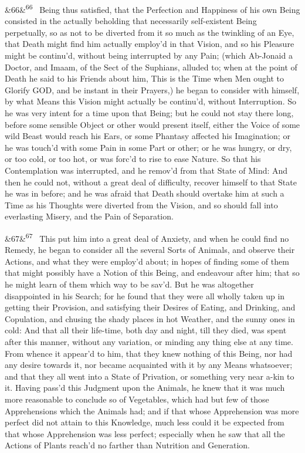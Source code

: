 \documentclass[12pt]{article}
\newcommand{\para}[1][]{\par\noindent\ifx&#1&\else\textsuperscript{\footnotesize #1}~\fi}
\begin{document}
\para[66] Being thus satisfied, that the Perfection and Happiness of his own Being consisted in the actually beholding that necessarily self-existent Being perpetually, so as not to be diverted from it so much as the twinkling of an Eye, that Death might find him actually employ'd in that Vision, and so his Pleasure might be continu'd, without being interrupted by any Pain; (which Ab-Jonaid a Doctor, and Imaam, of the Sect of the Suphians, alluded to; when at the point of Death he said to his Friends about him, This is the Time when Men ought to Glorify GOD, and be instant in their Prayers,) he began to consider with himself, by what Means this Vision might actually be continu'd, without Interruption. So he was very intent for a time upon that Being; but he could not stay there long, before some sensible Object or other would present itself, either the Voice of some wild Beast would reach his Ears, or some Phantasy affected his Imagination; or he was touch'd with some Pain in some Part or other; or he was hungry, or dry, or too cold, or too hot, or was forc'd to rise to ease Nature. So that his Contemplation was interrupted, and he remov'd from that State of Mind: And then he could not, without a great deal of difficulty, recover himself to that State he was in before; and he was afraid that Death should overtake him at such a Time as his Thoughts were diverted from the Vision, and so should fall into everlasting Misery, and the Pain of Separation.

\para[67] This put him into a great deal of Anxiety, and when he could find no Remedy, he began to consider all the several Sorts of Animals, and observe their Actions, and what they were employ'd about; in hopes of finding some of them that might possibly have a Notion of this Being, and endeavour after him; that so he might learn of them which way to be sav'd. But he was altogether disappointed in his Search; for he found that they were all wholly taken up in getting their Provision, and satisfying their Desires of Eating, and Drinking, and Copulation, and chusing the shady places in hot Weather, and the sunny ones in cold: And that all their life-time, both day and night, till they died, was spent after this manner, without any variation, or minding any thing else at any time. From whence it appear'd to him, that they knew nothing of this Being, nor had any desire towards it, nor became acquainted with it by any Means whatsoever; and that they all went into a State of Privation, or something very near a-kin to it. Having pass'd this Judgment upon the Animals, he knew that it was much more reasonable to conclude so of Vegetables, which had but few of those Apprehensions which the Animals had; and if that whose Apprehension was more perfect did not attain to this Knowledge, much less could it be expected from that whose Apprehension was less perfect; especially when he saw that all the Actions of Plants reach'd no farther than Nutrition and Generation.
\end{document}
